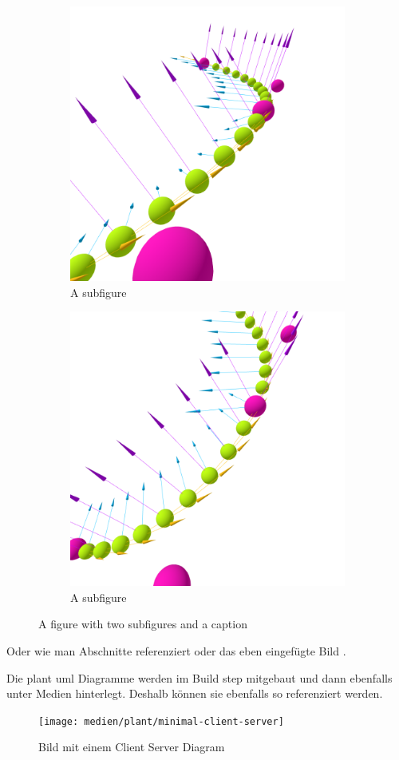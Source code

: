 \begin{figure}
\centering
\begin{subfigure}{.5\textwidth}
  \centering
  \includegraphics[width=.4\linewidth]{medien/render-shots/front}
  \caption{A subfigure}
  \label{fig:sub1}
\end{subfigure}%
\begin{subfigure}{.5\textwidth}
  \centering
  \includegraphics[width=.4\linewidth]{medien/render-shots/top}
  \caption{A subfigure}
  \label{fig:sub2}
\end{subfigure}
\caption{A figure with two subfigures and a caption}
\label{fig:test}
\end{figure}


Oder wie man Abschnitte referenziert  oder das eben eingefügte Bild .

Die plant uml Diagramme werden im Build step mitgebaut und dann ebenfalls unter Medien hinterlegt.
Deshalb können sie ebenfalls so referenziert werden.

\begin{figure}[htb]
    \centering
    \texttt{[image: medien/plant/minimal-client-server]}
    \caption{Bild mit einem Client Server Diagram}
    \ownsource
    \label{fig:minimal-client-server-diagram}
\end{figure}

